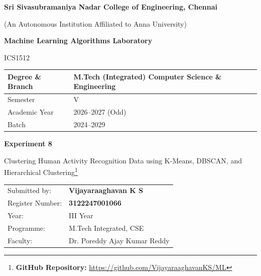 \documentclass[11pt,a4paper]{article}
\title{}
\date{}
\begin{document}
\begin{titlepage}
\centering
\vspace*{1cm}
{\Large\bfseries Sri Sivasubramaniya Nadar College of Engineering, Chennai\par}
\vspace{0.2cm}
{\normalsize (An Autonomous Institution Affiliated to Anna University)\par}
\vspace{1.2cm}

{\Large\bfseries Machine Learning Algorithms Laboratory\par}
\vspace{0.3cm}
{\large ICS1512\par}
\vspace{1.5cm}

\begin{tabular}{|p{5.5cm}|p{7cm}|}
\hline
Degree \& Branch & M.Tech (Integrated) Computer Science \& Engineering \\
\hline
Semester & V \\
\hline
Academic Year & 2026--2027 (Odd) \\
\hline
Batch & 2024--2029 \\
\hline
\end{tabular}

\vspace{1.8cm}
{\Large\bfseries Experiment 8\par}
\vspace{0.3cm}
{\large Clustering Human Activity Recognition Data using K-Means, DBSCAN, and Hierarchical Clustering\footnote{\textbf{GitHub Repository: }\url{https://github.com/VijayaraaghavanKS/ML}}\par}
\vspace{2.5cm}

\begin{tabular}{ll}
Submitted by: & \textbf{Vijayaraaghavan K S} \\[4pt]
Register Number: & \textbf{3122247001066} \\[4pt]
Year: & III Year \\[4pt]
Programme: & M.Tech Integrated, CSE \\[4pt]
Faculty: & Dr. Poreddy Ajay Kumar Reddy \\[4pt]
\end{tabular}

\vfill
\end{titlepage}

\tableofcontents
\newpage
\end{document}
